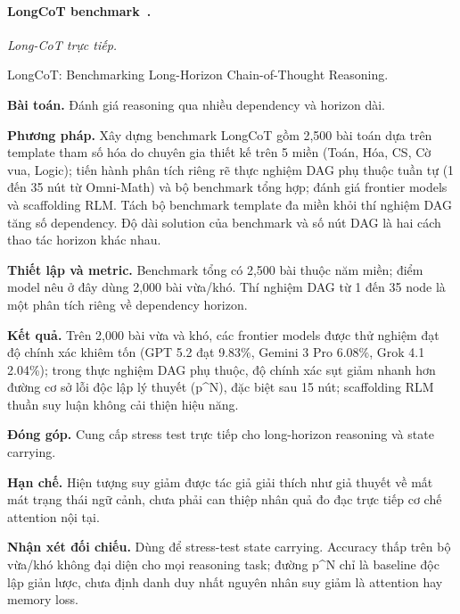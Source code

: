 \begin{samepage}
\paragraph{LongCoT benchmark~\cite{rra4_longcot}.}
\emph{Long-CoT trực tiếp.}\par
{\raggedright\noindent\small LongCoT: Benchmarking Long-Horizon Chain-of-Thought Reasoning.\par}
\noindent\textbf{Bài toán.} Đánh giá reasoning qua nhiều dependency và horizon dài.\par
\end{samepage}
\noindent\textbf{Phương pháp.} Xây dựng benchmark LongCoT gồm 2,500 bài toán dựa trên template tham số hóa do chuyên gia thiết kế trên 5 miền (Toán, Hóa, CS, Cờ vua, Logic); tiến hành phân tích riêng rẽ thực nghiệm DAG phụ thuộc tuần tự (1 đến 35 nút từ Omni-Math) và bộ benchmark tổng hợp; đánh giá frontier models và scaffolding RLM. Tách bộ benchmark template đa miền khỏi thí nghiệm DAG tăng số dependency. Độ dài solution của benchmark và số nút DAG là hai cách thao tác horizon khác nhau.\par
\noindent\textbf{Thiết lập và metric.} Benchmark tổng có 2,500 bài thuộc năm miền; điểm model nêu ở đây dùng 2,000 bài vừa/khó. Thí nghiệm DAG từ 1 đến 35 node là một phân tích riêng về dependency horizon.\par
\noindent\textbf{Kết quả.} Trên 2,000 bài vừa và khó, các frontier models được thử nghiệm đạt độ chính xác khiêm tốn (GPT 5.2 đạt 9.83\%, Gemini 3 Pro 6.08\%, Grok 4.1 2.04\%); trong thực nghiệm DAG phụ thuộc, độ chính xác sụt giảm nhanh hơn đường cơ sở lỗi độc lập lý thuyết (p\textasciicircum{}N), đặc biệt sau 15 nút; scaffolding RLM thuần suy luận không cải thiện hiệu năng.\par
\noindent\textbf{Đóng góp.} Cung cấp stress test trực tiếp cho long-horizon reasoning và state carrying.\par
\noindent\textbf{Hạn chế.} Hiện tượng suy giảm được tác giả giải thích như giả thuyết về mất mát trạng thái ngữ cảnh, chưa phải can thiệp nhân quả đo đạc trực tiếp cơ chế attention nội tại.\par
\begin{samepage}
\noindent\textbf{Nhận xét đối chiếu.} Dùng để stress-test state carrying. Accuracy thấp trên bộ vừa/khó không đại diện cho mọi reasoning task; đường p\textasciicircum{}N chỉ là baseline độc lập giản lược, chưa định danh duy nhất nguyên nhân suy giảm là attention hay memory loss.\par
{}
\end{samepage}

